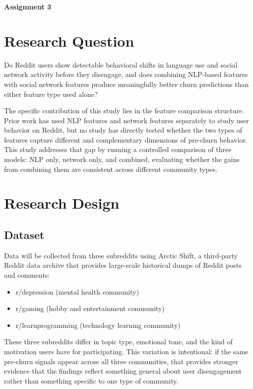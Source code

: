 \documentclass[12pt]{article}
\begin{document}
\begin{center}
    {\LARGE \textbf{Assignment 3}}
\end{center}



\section*{Research Question}

Do Reddit users show detectable behavioral shifts in language use and social network activity before they disengage, and does combining NLP-based features with social network features produce meaningfully better churn predictions than either feature type used alone?

The specific contribution of this study lies in the feature comparison structure. Prior work has used NLP features and network features separately to study user behavior on Reddit, but no study has directly tested whether the two types of features capture different and complementary dimensions of pre-churn behavior. This study addresses that gap by running a controlled comparison of three models: NLP only, network only, and combined, evaluating whether the gains from combining them are consistent across different community types.

\section*{Research Design}

\subsection*{Dataset}

Data will be collected from three subreddits using Arctic Shift, a third-party Reddit data archive that provides large-scale historical dumps of Reddit posts and comments:

\begin{itemize}
    \item r/depression (mental health community)
    \item r/gaming (hobby and entertainment community)
    \item r/learnprogramming (technology learning community)
\end{itemize}

These three subreddits differ in topic type, emotional tone, and the kind of motivation users have for participating. This variation is intentional: if the same pre-churn signals appear across all three communities, that provides stronger evidence that the findings reflect something general about user disengagement rather than something specific to one type of community.
\end{document}
